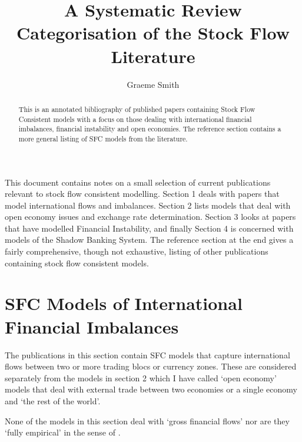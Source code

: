 \documentclass[twoside,a4paper,11pt]{article}
\title{A Systematic Review Categorisation of the Stock Flow Literature}
\author{Graeme Smith}
\begin{document}
\maketitle
\begin{abstract} This is an annotated bibliography of published papers containing Stock Flow Consistent models with a focus on those dealing with international financial imbalances, financial instability and open economies. The   reference section contains a more general listing of SFC models from the literature.
\end{abstract}

This document contains notes on a small selection of current publications relevant to stock flow consistent modelling. Section 1 deals with papers that model international flows and imbalances. Section 2 lists models that deal with open economy issues and exchange rate determination. Section 3 looks at papers that have modelled Financial Instability, and finally Section 4 is concerned with models of the Shadow Banking System. The reference section at the end gives a fairly comprehensive, though not exhaustive, listing of other publications containing stock flow consistent models.

\section{SFC Models of International Financial Imbalances}
The publications in this section contain SFC models that capture international flows between two or more trading blocs or currency zones. These are considered separately from the models in section 2 which I have called `open economy' models that deal with external trade between two economies or a single economy and `the rest of the world'.

None of the models in this section deal with `gross financial flows' nor are they `fully empirical' in the sense of \cite{Caverzasi2014a}.  \\[5pt]
\end{document}
